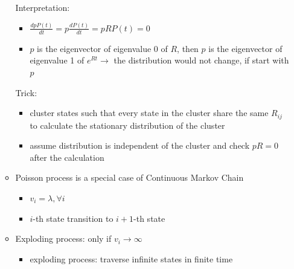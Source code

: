\documentclass[a4paper]{article}
\begin{document}
\begin{itemize}
\begin{itemize}
                Interpretation:
                \begin{itemize}
                    \item $\frac{d p P(t)}{dt} = p \frac{d P(t)}{dt} = pR P(t) = 0$
                    \item $p$ is the eigenvector of eigenvalue 0 of $R$, then $p$ is the eigenvector of eigenvalue 1 of $e^{Rt} \rightarrow$ the distribution would not change, if start with $p$
                \end{itemize}
                Trick:
                \begin{itemize}
                    \item cluster states such that every state in the cluster share the same $R_{ij}$ to calculate the stationary distribution of the cluster
                    \item assume distribution is independent of the cluster and check $p R = 0$ after the calculation
                \end{itemize}
            \item Poisson process is a special case of Continuous Markov Chain
                \begin{itemize}
                    \item $v_i = \lambda, \forall i$
                    \item $i$-th state transition to $i+1$-th state
                \end{itemize}
            \item Exploding process: only if $v_i \rightarrow \infty$
                \begin{itemize}
                    \item exploding process: traverse infinite states in finite time
                \end{itemize}
        \end{itemize}
\end{itemize}
\end{document}
